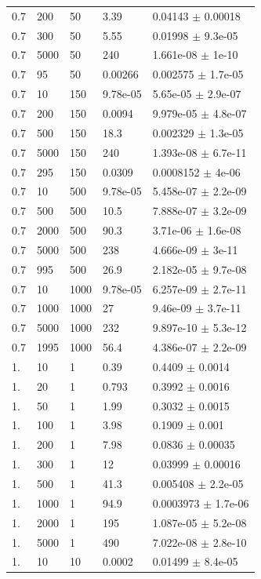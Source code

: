 \begin{longtable}{lllll}
	0.7 & 200 & 50 & 3.39 & 0.04143 $\pm$ 0.00018 \\
	0.7 & 300 & 50 & 5.55 & 0.01998 $\pm$ 9.3e-05 \\
	0.7 & 5000 & 50 & 240 & 1.661e-08 $\pm$ 1e-10 \\
	0.7 & 95 & 50 & 0.00266 & 0.002575 $\pm$ 1.7e-05 \\
	0.7 & 10 & 150 & 9.78e-05 & 5.65e-05 $\pm$ 2.9e-07 \\
	0.7 & 200 & 150 & 0.0094 & 9.979e-05 $\pm$ 4.8e-07 \\
	0.7 & 500 & 150 & 18.3 & 0.002329 $\pm$ 1.3e-05 \\
	0.7 & 5000 & 150 & 240 & 1.393e-08 $\pm$ 6.7e-11 \\
	0.7 & 295 & 150 & 0.0309 & 0.0008152 $\pm$ 4e-06 \\
	0.7 & 10 & 500 & 9.78e-05 & 5.458e-07 $\pm$ 2.2e-09 \\
	0.7 & 500 & 500 & 10.5 & 7.888e-07 $\pm$ 3.2e-09 \\
	0.7 & 2000 & 500 & 90.3 & 3.71e-06 $\pm$ 1.6e-08 \\
	0.7 & 5000 & 500 & 238 & 4.666e-09 $\pm$ 3e-11 \\
	0.7 & 995 & 500 & 26.9 & 2.182e-05 $\pm$ 9.7e-08 \\
	0.7 & 10 & 1000 & 9.78e-05 & 6.257e-09 $\pm$ 2.7e-11 \\
	0.7 & 1000 & 1000 & 27 & 9.46e-09 $\pm$ 3.7e-11 \\
	0.7 & 5000 & 1000 & 232 & 9.897e-10 $\pm$ 5.3e-12 \\
	0.7 & 1995 & 1000 & 56.4 & 4.386e-07 $\pm$ 2.2e-09 \\
	1. & 10 & 1 & 0.39 & 0.4409 $\pm$ 0.0014 \\
	1. & 20 & 1 & 0.793 & 0.3992 $\pm$ 0.0016 \\
	1. & 50 & 1 & 1.99 & 0.3032 $\pm$ 0.0015 \\
	1. & 100 & 1 & 3.98 & 0.1909 $\pm$ 0.001 \\
	1. & 200 & 1 & 7.98 & 0.0836 $\pm$ 0.00035 \\
	1. & 300 & 1 & 12 & 0.03999 $\pm$ 0.00016 \\
	1. & 500 & 1 & 41.3 & 0.005408 $\pm$ 2.2e-05 \\
	1. & 1000 & 1 & 94.9 & 0.0003973 $\pm$ 1.7e-06 \\
	1. & 2000 & 1 & 195 & 1.087e-05 $\pm$ 5.2e-08 \\
	1. & 5000 & 1 & 490 & 7.022e-08 $\pm$ 2.8e-10 \\
	1. & 10 & 10 & 0.0002 & 0.01499 $\pm$ 8.4e-05 \\

\end{longtable}
